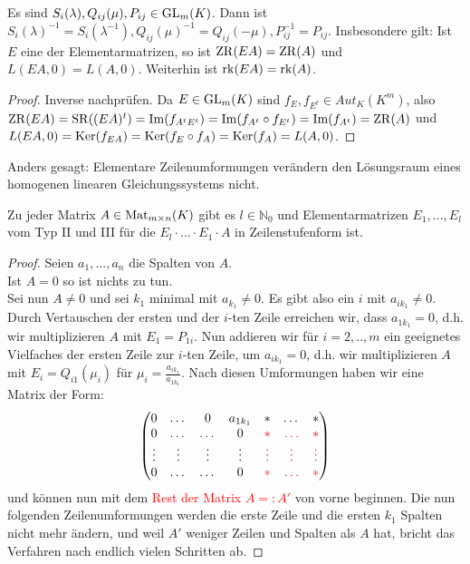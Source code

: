 \begin{lemma}
	Es sind $S_i(\lambda),Q_{ij}(\mu),P_{ij}\in \operatorname{GL}_m(K)$. Dann ist $S_i(\lambda)^{-1}=S_i(\lambda^{-1}), Q_{ij}(\mu)
	^{-1}=Q_{ij}(-\mu),P_{ij}^{-1}=P_{ij}$. Insbesondere gilt: Ist $E$ eine der Elementarmatrizen, so ist $\operatorname{ZR}(EA)=\operatorname{ZR}(A)$ und $L(EA,0)=
	L(A,0)$. Weiterhin ist $\operatorname{rk}(EA)=\operatorname{rk}(A)$.
\end{lemma}
\begin{proof}
	Inverse nachprüfen. Da $E\in \operatorname{GL}_m(K)$ sind $f_E,f_{E^t}\in Aut_K(K^m)$, also $\operatorname{ZR}(EA)=\operatorname{SR}((EA)^t)=\operatorname{Im}(f_{A^tE^t})=\operatorname{Im}(f_{A^t}\circ
	f_{E^t})=\operatorname{Im}(f_{A^t})=\operatorname{ZR}(A)$ und $L(EA,0)=\operatorname{Ker}(f_{EA})=\operatorname{Ker}(f_E\circ f_A)=\operatorname{Ker}(f_A)=L(A,0)$.
\end{proof}

\begin{remark}
	Anders gesagt: Elementare Zeilenumformungen verändern den Lösungsraum eines homogenen linearen Gleichungssystems 
	nicht.
\end{remark}

\begin{theorem}
	Zu jeder Matrix $A\in \operatorname{Mat}_{m\times n}(K)$ gibt es $l\in \mathbb N_0$ und 
	Elementarmatrizen $E_1,...,E_l$ vom Typ II und III für die $E_l\cdot ... \cdot E_1\cdot A$ in Zeilenstufenform ist. 
\end{theorem}
\begin{proof}
	Seien $a_1,...,a_n$ die Spalten von $A$. \\
	Ist $A=0$ so ist nichts zu tun. \\
	Sei nun $A\neq 0$ und sei $k_1$ minimal mit $a_{k_1}\neq 0$. Es gibt also ein $i$ mit $a_{ik_1}\neq 0$. Durch Vertauschen der ersten 
	und der $i$-ten Zeile erreichen wir, dass $a_{1k_1}=0$, d.h. wir multiplizieren $A$ mit $E_1=P_{1i}$. Nun addieren wir für $i=2,..,m$ 
	ein geeignetes Vielfaches der ersten Zeile zur $i$-ten Zeile, um $a_{ik_1}=0$, d.h. wir multiplizieren $A$ mit $E_i=Q_{i1}(\mu_i)$ für 
	$\mu_i=\frac{a_{ik_1}}{a_{1k_1}}$. Nach diesen Umformungen haben wir eine Matrix der Form:
	\begin{align}\begin{pmatrix}
		0 & \dots & 0 & a_{1k_1} & * & \dots & *\\
		0 & \dots & \dots & 0 & \textcolor{red}{*} & \textcolor{red}{\dots} & \textcolor{red}{*}\\
		\vdots & \vdots & \vdots & \vdots & \textcolor{red}{\vdots} & \textcolor{red}{\vdots} & \textcolor{red}{\vdots}\\
		0 & \dots & \dots & 0 & \textcolor{red}{*} & \textcolor{red}{\dots} & \textcolor{red}{*}\\
		\end{pmatrix}\notag\end{align}
	und können nun mit dem \textcolor{red}{Rest der Matrix $A=:A'$} von vorne beginnen. Die nun folgenden Zeilenumformungen werden die 
	erste Zeile und die ersten $k_1$ Spalten nicht mehr ändern, und weil $A'$ weniger Zeilen und Spalten als $A$ hat, bricht das Verfahren 
	nach endlich vielen Schritten ab.
\end{proof}

